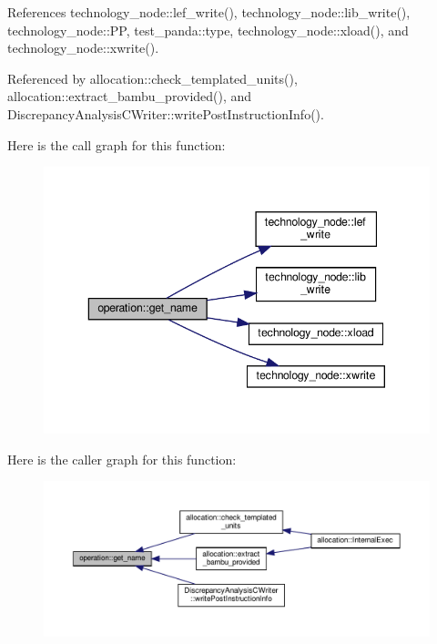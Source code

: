 References technology\+\_\+node\+::lef\+\_\+write(), technology\+\_\+node\+::lib\+\_\+write(), technology\+\_\+node\+::\+PP, test\+\_\+panda\+::type, technology\+\_\+node\+::xload(), and technology\+\_\+node\+::xwrite().



Referenced by allocation\+::check\+\_\+templated\+\_\+units(), allocation\+::extract\+\_\+bambu\+\_\+provided(), and Discrepancy\+Analysis\+C\+Writer\+::write\+Post\+Instruction\+Info().

Here is the call graph for this function\+:
\nopagebreak
\begin{figure}[H]
\begin{center}
\leavevmode
\includegraphics[width=343pt]{d9/dc0/structoperation_af507cadd6f2ee17b88e7cb62772fe1f2_cgraph}
\end{center}
\end{figure}
Here is the caller graph for this function\+:
\nopagebreak
\begin{figure}[H]
\begin{center}
\leavevmode
\includegraphics[width=350pt]{d9/dc0/structoperation_af507cadd6f2ee17b88e7cb62772fe1f2_icgraph}
\end{center}
\end{figure}
\mbox{\label{structoperation_aee6103b8dad5aed3782b5e3c1c885316}} 
